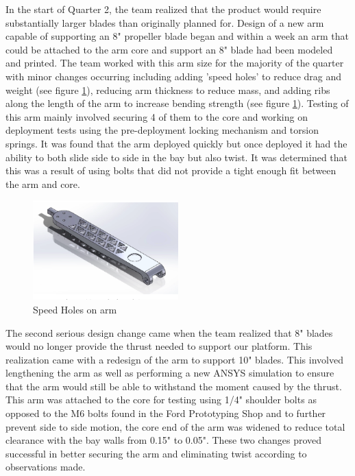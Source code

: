 In the start of Quarter 2, the team realized that the product would require substantially larger blades than originally planned for. Design of a new arm capable of supporting an 8" propeller blade began and within a week an arm that could be attached to the arm core and support an 8" blade had been modeled and printed. The team worked with this arm size for the majority of the quarter with minor changes occurring including adding 'speed holes' to reduce drag and weight (see figure \ref{fig:speedholes}), reducing arm thickness to reduce mass, and adding ribs along the length of the arm to increase bending strength (see figure \ref{fig:speedholes}). Testing of this arm mainly involved securing 4 of them to the core and working on deployment tests using the pre-deployment locking mechanism and torsion springs. It was found that the arm deployed quickly but once deployed it had the ability to both slide side to side in the bay but also twist. It was determined that this was a result of using bolts that did not provide a tight enough fit between the arm and core.

\begin{figure}
    \centering
    \includegraphics[width=0.5\textwidth]{src/figs/armwithspeed.png}
    \caption{Speed Holes on arm}
    \label{fig:speedholes}
\end{figure}

The second serious design change came when the team realized that 8" blades would no longer provide the thrust needed to support our platform. This realization came with a redesign of the arm to support 10" blades. This involved lengthening the arm as well as performing a new ANSYS simulation to ensure that the arm would still be able to withstand the moment caused by the thrust. This arm was attached to the core for testing using 1/4" shoulder bolts as opposed to the M6 bolts found in the Ford Prototyping Shop and to further prevent side to side motion, the core end of the arm was widened to reduce total clearance with the bay walls from 0.15" to 0.05". These two changes proved successful in better securing the arm and eliminating twist according to observations made.

